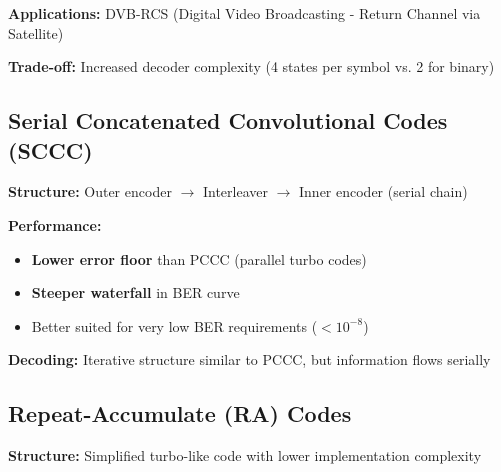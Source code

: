 \textbf{Applications:} DVB-RCS (Digital Video Broadcasting - Return Channel via Satellite)

\textbf{Trade-off:} Increased decoder complexity (4 states per symbol vs. 2 for binary)

\subsection{Serial Concatenated Convolutional Codes (SCCC)}

\textbf{Structure:} Outer encoder $\rightarrow$ Interleaver $\rightarrow$ Inner encoder (serial chain)

\begin{center}
\end{center}

\textbf{Performance:}
\begin{itemize}
\item \textbf{Lower error floor} than PCCC (parallel turbo codes)
\item \textbf{Steeper waterfall} in BER curve
\item Better suited for very low BER requirements ($< 10^{-8}$)
\end{itemize}

\textbf{Decoding:} Iterative structure similar to PCCC, but information flows serially

\subsection{Repeat-Accumulate (RA) Codes}

\textbf{Structure:} Simplified turbo-like code with lower implementation complexity

